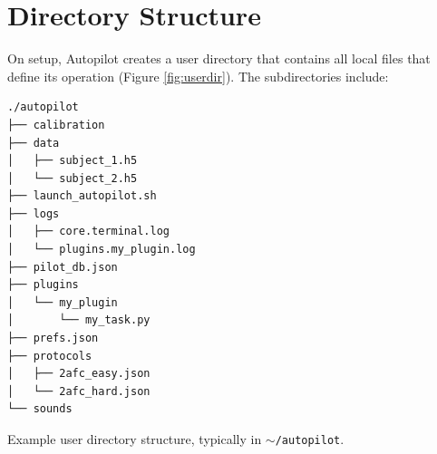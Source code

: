 \section{Directory Structure}
\label{sec:userdir}

On setup, Autopilot creates a user directory that contains all local files that define its operation (Figure \ref{fig:userdir}). The subdirectories include:

\begin{marginfigure}[2.15cm]
\begin{verbatim}
./autopilot
├── calibration
├── data
│   ├── subject_1.h5
│   └── subject_2.h5
├── launch_autopilot.sh
├── logs
│   ├── core.terminal.log
│   └── plugins.my_plugin.log
├── pilot_db.json
├── plugins
│   └── my_plugin
│       └── my_task.py
├── prefs.json
├── protocols
│   ├── 2afc_easy.json
│   └── 2afc_hard.json
└── sounds
\end{verbatim}
\caption{Example user directory structure, typically in \texttt{$\sim$/autopilot}.}
\label{fig:userdir}
\end{marginfigure}

